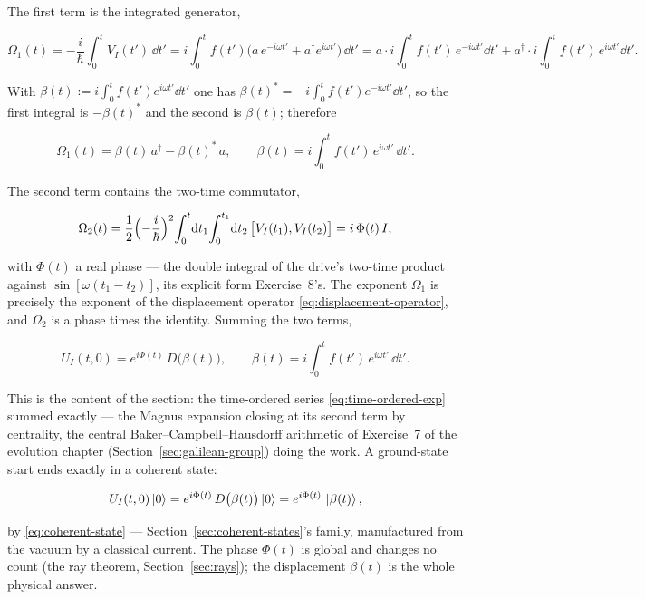 The first term is the integrated generator,
\begin{linenomath}
    \begin{equation*}
        \Omega_1(t) = -\frac{i}{\hbar}\int_0^t V_I(t')\,\dd t'
        = i\int_0^t f(t')\bigl(a\,e^{-i\omega t'} + a^\dagger e^{i\omega t'}\bigr)\,\dd t'
        = a\cdot i\!\int_0^t\!f(t')\,e^{-i\omega t'}\dd t'
          + a^\dagger\cdot i\!\int_0^t\!f(t')\,e^{i\omega t'}\dd t' .
    \end{equation*}
\end{linenomath}
With $\beta(t):=i\int_0^t f(t')e^{i\omega t'}\dd t'$ one has $\beta(t)^{*}=-i\int_0^t f(t')e^{-i\omega t'}\dd t'$, so the first integral is $-\beta(t)^{*}$ and the second is $\beta(t)$; therefore
\begin{linenomath}
    \begin{equation*}
        \Omega_1(t) = \beta(t)\,a^\dagger - \beta(t)^{*}\,a,
        \qquad
        \beta(t) = i\int_0^t f(t')\,e^{i\omega t'}\,\dd t' .
    \end{equation*}
\end{linenomath}
The second term contains the two-time commutator,
\begin{linenomath}
    \begin{equation*}
        \Omega_2(t) = \frac12\Bigl(-\frac{i}{\hbar}\Bigr)^2\!\int_0^t\!\mathrm{d} t_1\!\int_0^{t_1}\!\mathrm{d} t_2\,\bigl[V_I(t_1), V_I(t_2)\bigr] = i\,\Phi(t)\,I ,
    \end{equation*}
\end{linenomath}
with $\Phi(t)$ a real phase --- the double integral of the drive's two-time product against $\sin[\omega(t_1 - t_2)]$, its explicit form Exercise~8's. The exponent $\Omega_1$ is precisely the exponent of the displacement operator \eqref{eq:displacement-operator}, and $\Omega_2$ is a phase times the identity. Summing the two terms,
\begin{linenomath}
    \begin{equation}
        U_I(t, 0) = e^{i\Phi(t)}\,D\bigl(\beta(t)\bigr),
        \qquad
        \beta(t) = i\int_0^t f(t')\,e^{i\omega t'}\,\dd t' .
        \label{eq:displacement-solution}
    \end{equation}
\end{linenomath}
This is the content of the section: the time-ordered series \eqref{eq:time-ordered-exp} summed exactly --- the Magnus expansion closing at its second term by centrality, the central Baker--Campbell--Hausdorff arithmetic of Exercise~7 of the evolution chapter (Section~\ref{sec:galilean-group}) doing the work. A ground-state start ends exactly in a coherent state:
\begin{linenomath}
    \begin{equation*}
        U_I(t, 0)\ket{0} = e^{i\Phi(t)}\,D\bigl(\beta(t)\bigr)\ket{0} = e^{i\Phi(t)}\,\ket{\beta(t)} ,
    \end{equation*}
\end{linenomath}
by \eqref{eq:coherent-state} --- Section~\ref{sec:coherent-states}'s family, manufactured from the vacuum by a classical current. The phase $\Phi(t)$ is global and changes no count (the ray theorem, Section~\ref{sec:rays}); the displacement $\beta(t)$ is the whole physical answer.


